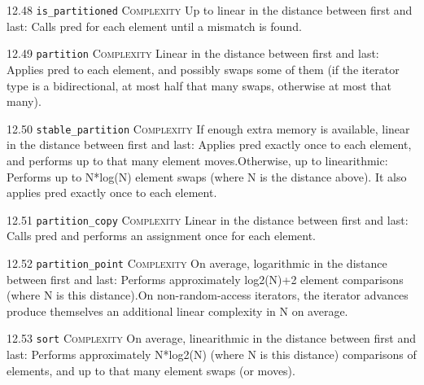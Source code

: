 \noindent\textcolor{corange}{12.48 \texttt{is\_partitioned}} \textsc{Complexity} Up to linear in the distance between first and last: Calls pred for each element until a mismatch is found. \vspace{0.5em}

\noindent\textcolor{corange}{12.49 \texttt{partition}} \textsc{Complexity} Linear in the distance between first and last: Applies  pred to each element, and possibly swaps some of them (if the iterator type is a bidirectional, at most half that many swaps, otherwise at most that many). \vspace{0.5em}

\noindent\textcolor{cred}{12.50 \texttt{stable\_partition}} \textsc{Complexity} If enough extra memory is available, linear in the distance between first and last: Applies pred exactly once to each element, and performs up to that many element moves.Otherwise, up to linearithmic: Performs up to N*log(N) element swaps (where N is the distance above). It also applies pred exactly once to each element. \vspace{0.5em}

\noindent\textcolor{corange}{12.51 \texttt{partition\_copy}} \textsc{Complexity} Linear in the distance between first and last: Calls pred and performs an assignment once for each element. \vspace{0.5em}

\noindent\textcolor{corange}{12.52 \texttt{partition\_point}} \textsc{Complexity} On average, logarithmic in the distance between first and last: Performs approximately log2(N)+2 element comparisons (where N is this distance).On non-random-access iterators, the iterator advances produce themselves an additional linear complexity in N on average. \vspace{0.5em}

\noindent\textcolor{cred}{12.53 \texttt{sort}} \textsc{Complexity} On average, linearithmic in the distance between first and last: Performs approximately N*log2(N) (where N is this distance) comparisons of elements, and up to that many element swaps (or moves). \vspace{0.5em}

